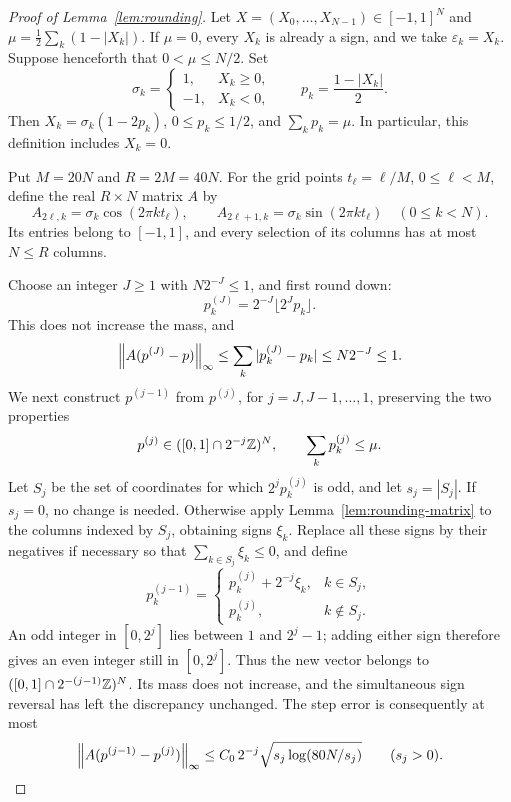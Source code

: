 \begin{proof}[Proof of Lemma~\ref{lem:rounding}]
Let $X=(X_0,\ldots,X_{N-1})\in[-1,1]^N$ and
$\mu=\frac12\sum_k(1-|X_k|)$.  If $\mu=0$, every $X_k$ is already a
sign, and we take $\varepsilon_k=X_k$.  Suppose henceforth that
$0<\mu\le N/2$.  Set
\[
 \sigma_k=\begin{cases}1,&X_k\ge0,\\-1,&X_k<0,\end{cases}
 \qquad p_k=\frac{1-|X_k|}{2}.
\]
Then $X_k=\sigma_k(1-2p_k)$, $0\le p_k\le1/2$, and
$\sum_kp_k=\mu$.  In particular, this definition includes $X_k=0$.

Put $M=20N$ and $R=2M=40N$.  For the grid points
$t_\ell=\ell/M$, $0\le\ell<M$, define the real $R\times N$ matrix $A$ by
\[
 A_{2\ell,k}=\sigma_k\cos(2\pi kt_\ell),\qquad
 A_{2\ell+1,k}=\sigma_k\sin(2\pi kt_\ell)
 \quad(0\le k<N).
\]
Its entries belong to $[-1,1]$, and every selection of its columns has
at most $N\le R$ columns.

Choose an integer $J\ge1$ with $N2^{-J}\le1$, and first round down:
\[
 p^{(J)}_k=2^{-J}\lfloor2^Jp_k\rfloor.
\]
This does not increase the mass, and
\begin{equation}\label{eq:rounding-initial}
 \left\lVert A(p^{(J)}-p)\right\rVert_\infty
 \le\sum_k|p^{(J)}_k-p_k|\le N2^{-J}\le1.
\end{equation}
We next construct $p^{(j-1)}$ from $p^{(j)}$, for $j=J,J-1,\ldots,1$,
preserving the two properties
\[
 p^{(j)}\in([0,1]\cap2^{-j}\mathbb Z)^N,
 \qquad \sum_kp^{(j)}_k\le\mu.
\]
Let $S_j$ be the set of coordinates for which $2^jp^{(j)}_k$ is odd,
and let $s_j=|S_j|$.  If $s_j=0$, no change is needed.  Otherwise apply
Lemma~\ref{lem:rounding-matrix} to the columns indexed by $S_j$, obtaining
signs $\xi_k$.  Replace all these signs by their negatives if necessary
so that $\sum_{k\in S_j}\xi_k\le0$, and define
\[
 p^{(j-1)}_k=
 \begin{cases}
 p^{(j)}_k+2^{-j}\xi_k,&k\in S_j,\\
 p^{(j)}_k,&k\notin S_j.
 \end{cases}
\]
An odd integer in $[0,2^j]$ lies between $1$ and $2^j-1$; adding either
sign therefore gives an even integer still in $[0,2^j]$.  Thus the
new vector belongs to $([0,1]\cap2^{-(j-1)}\mathbb Z)^N$.  Its mass does not
increase, and the simultaneous sign reversal has left the discrepancy
unchanged.  The step error is consequently at most
\begin{equation}\label{eq:rounding-step}
 \left\lVert A(p^{(j-1)}-p^{(j)})\right\rVert_\infty
 \le C_0\,2^{-j}\sqrt{s_j\log(80N/s_j)}
 \qquad(s_j>0).
\end{equation}


\end{proof}
